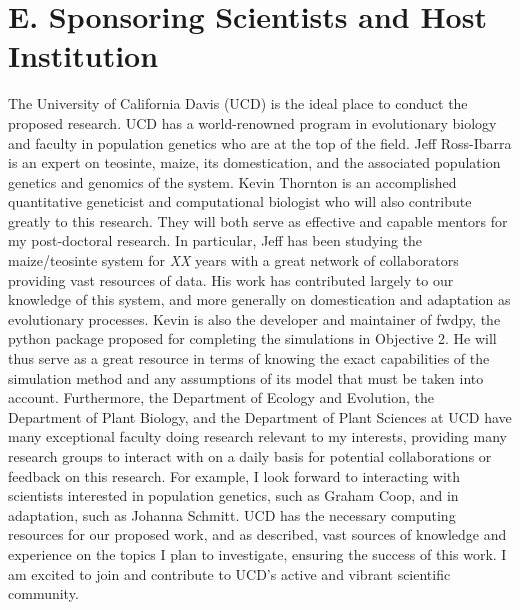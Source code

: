 {


\section*{E. Sponsoring Scientists and Host Institution}

The University of California Davis (UCD) is the ideal place to conduct the proposed research. UCD has a world-renowned program in evolutionary biology and faculty in population genetics who are at the top of the field. Jeff Ross\--Ibarra is an expert on teosinte, maize, its domestication, and the associated population genetics and genomics of the system.  
Kevin Thornton is an accomplished quantitative geneticist and computational biologist who will also contribute greatly to this research. 
They will both serve as effective and capable mentors for my post-doctoral research. In particular, Jeff has been studying the maize\//teosinte system for \emph{XX} years with a great network of collaborators providing vast resources of data. His work has contributed largely to our knowledge of this system, and more generally on domestication and adaptation as evolutionary processes. Kevin is also the developer and maintainer of fwdpy, the python package proposed for completing the simulations in Objective 2. He will thus serve as a great resource in terms of knowing the exact capabilities of the simulation method and any assumptions of its model that must be taken into account.
Furthermore, the Department of Ecology and Evolution, the Department of Plant Biology, and the Department of Plant Sciences at UCD have many exceptional faculty doing research relevant to my interests, providing many research groups to interact with on a daily basis for potential collaborations or feedback on this research. For example, I look forward to interacting with scientists interested in population genetics, such as Graham Coop, and in adaptation, such as Johanna Schmitt. %
UCD has the necessary computing resources for our proposed work, and as described, vast sources of knowledge and experience on the topics I plan to investigate, ensuring the success of this work. I am excited to join and contribute to UCD's active and vibrant scientific community. 


}
